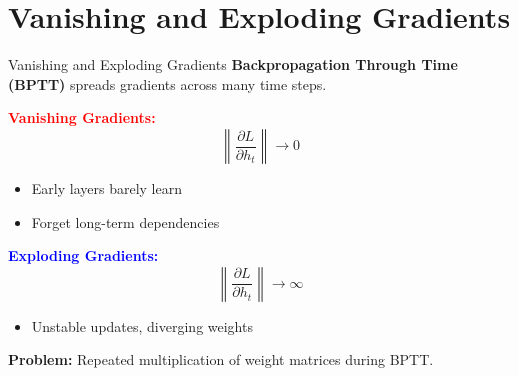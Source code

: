 \section{Vanishing and Exploding Gradients}
\begin{frame}{Vanishing and Exploding Gradients}
    \textbf{Backpropagation Through Time (BPTT)} spreads gradients across many time steps.

    \vspace{1em}
    \textcolor{red}{\textbf{Vanishing Gradients:}}
    \[
        \left\|\frac{\partial L}{\partial h_t}\right\| \rightarrow 0
    \]
    \begin{itemize}
        \item Early layers barely learn
        \item Forget long-term dependencies
    \end{itemize}

    \vspace{1em}
    \textcolor{blue}{\textbf{Exploding Gradients:}}
    \[
        \left\|\frac{\partial L}{\partial h_t}\right\| \rightarrow \infty
    \]
    \begin{itemize}
        \item Unstable updates, diverging weights
    \end{itemize}

    \vspace{1em}
    \textbf{Problem:} Repeated multiplication of weight matrices during BPTT.
\end{frame}


